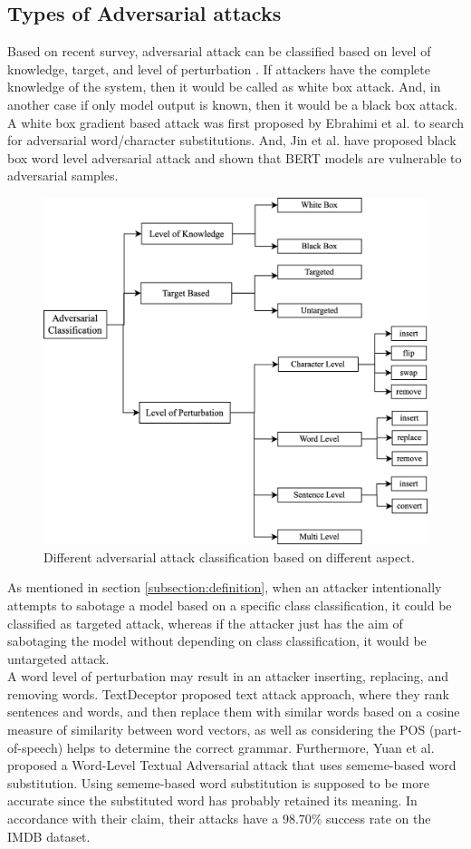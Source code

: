 \documentclass[%
	BCOR=8mm, %
	DIV=12,
	toc=bibliography, %
	toc=listof, %
	oneside, %
	egregdoesnotlikesansseriftitles, %
	]{scrbook}
\begin{document}
\subsection{Types of Adversarial attacks}
\label{subsection:attacktypes}
Based on recent survey, adversarial attack can be classified based on level of knowledge, target, and level of perturbation \cite{huq_adversarial_2020,wang_towards_2021}. If attackers have the complete knowledge of the system, then it would be called as  white box attack. And, in another case if only model output is known, then it would be a black box attack. A white box gradient based attack was first proposed by Ebrahimi et al. \cite{ebrahimi_hotflip_2018} to search for adversarial word/character substitutions. And, Jin et al. \cite{jin_is_2020} have proposed black box word level adversarial attack and shown that BERT models are vulnerable to adversarial samples.\\
\begin{figure}[h!]
    \centering
    \includegraphics[width=0.65\linewidth]{img/attack_classification.png}
    \caption[Adversarial attacks classification diagram]{Different adversarial attack classification based on different aspect.}
    \label{fig:attack_classification}
\end{figure}
As mentioned in section \ref{subsection:definition}, when an attacker intentionally attempts to sabotage a model based on a specific class classification, it could be classified as targeted attack, whereas if the attacker just has the aim of sabotaging the model without depending on class classification, it would be untargeted attack.\\
A word level of perturbation may result in an attacker inserting, replacing, and removing words. TextDeceptor \cite{saxena_textdecepter_2020} proposed text attack approach, where they rank sentences and words, and then replace them with similar words based on a cosine measure of similarity between word vectors, as well as considering the POS (part-of-speech) helps to determine the correct grammar. Furthermore, Yuan et al. \cite{zang_word-level_2019} proposed a Word-Level Textual Adversarial attack that uses sememe-based word substitution. Using sememe-based word substitution is supposed to be more accurate since the substituted word has probably retained its meaning. In accordance with their claim, their attacks have a 98.70\% success rate on the IMDB dataset.\\
\end{document}
